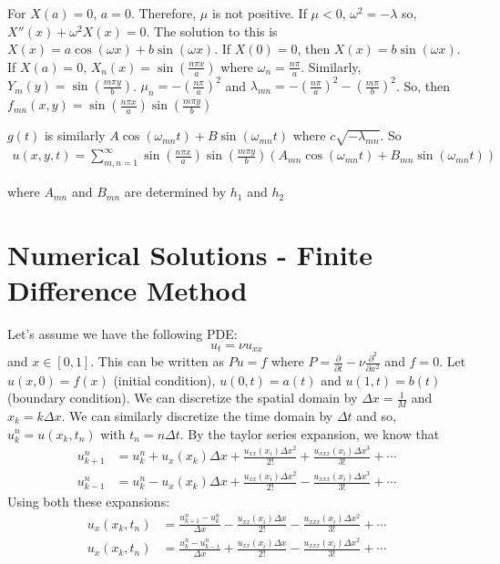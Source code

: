 \documentclass[12pt]{article}
\begin{document}
For $X(a) = 0$, $a = 0$. Therefore, $\mu$ is not positive. If $\mu < 0$, $\omega^2 = - \lambda$ so, $X''(x) + \omega^2X(x) = 0$. The solution to this is $X(x) = a\cos(\omega x) + b\sin(\omega x)$. If $X(0) = 0$, then $X(x) = b\sin (\omega x)$. If $X(a) = 0$, $X_n(x) = \sin (\frac{n \pi x}{a})$ where $\omega_n = \frac{n \pi}{a}$. Similarly, $Y_m(y) = \sin (\frac{m \pi y}{b})$. $\mu_n = -\left(\frac{n \pi}{a}\right)^2$ and $\lambda_{mn}= -\left(\frac{n \pi}{a}\right)^2 -\left(\frac{m \pi}{b}\right)^2$. So, then $f_{mn}(x, y) = \sin (\frac{n \pi x}{a})\sin (\frac{m \pi y}{b})$


 $g(t)$ is similarly $A\cos(\omega_{mn}t) + B\sin(\omega_{mn}t)$ where $c\sqrt{-\lambda_{mn}}$. So 
 \begin{align*}
     u(x, y, t) = \sum_{m, n = 1}^{\infty} \sin \left(\frac{n \pi x}{a}\right)\sin \left(\frac{m \pi y}{b}\right)\left(A_{mn}\cos(\omega_{mn}t) + B_{mn}\sin(\omega_{mn}t)\right)
 \end{align*}

 where $A_{mn}$ and $B_{mn}$ are determined by $h_1$ and $h_2$

\section{Numerical Solutions - Finite Difference Method}






Let's assume we have the following PDE: 
$$u_t = \nu u_{xx}$$
and $x \in [0, 1]$. This can be written as $P u = f$ where $P = \frac{\partial }{\partial t } -\nu \frac{\partial^2 }{\partial x^2 } $ and $f = 0$. Let $u(x, 0) =  f(x)$ (initial condition), $u(0, t) = a(t)$ and $u(1, t) = b(t)$ (boundary condition).
We can discretize the spatial domain by $\Delta x = \frac{1}{M}$ and $x_k = k \Delta x$. We can similarly discretize the time domain by $\Delta t$ and so, $u^n_k = u(x_k, t_n)$ with $t_n = n\Delta t$.
By the taylor series expansion, we know that
\begin{align*}
    u^n_{k + 1} &= u^n_{k} + u_x(x_k)\Delta x + \frac{u_{xx}(x_i)\Delta x^2}{2!} + \frac{u_{xxx}(x_i)\Delta x^3}{3!} + \cdots \\
    u^n_{k - 1} &= u^n_{k} - u_x(x_k)\Delta x + \frac{u_{xx}(x_i)\Delta x^2}{2!} - \frac{u_{xxx}(x_i)\Delta x^3}{3!} + \cdots
\end{align*}
Using both these expansions:
\begin{align*}
     u_x(x_k, t_n) &= \frac{u^n_{k + 1} - u^n_{k}}{\Delta x} - \frac{u_{xx}(x_i)\Delta x}{2!} - \frac{u_{xxx}(x_i)\Delta x^2}{3!} + \cdots \\
    u_x(x_k, t_n) &= \frac{u^n_{k} - u^n_{k - 1}}{\Delta x} + \frac{u_{xx}(x_i)\Delta x}{2!} - \frac{u_{xxx}(x_i)\Delta x^2}{3!} + \cdots \\
\end{align*}
\end{document}
